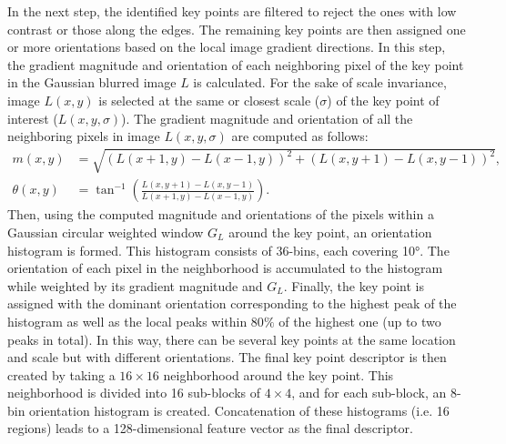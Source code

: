 \begin{description}
In the next step, the identified key points are filtered to reject the ones with low contrast or those along the edges.
The remaining key points are then assigned one or more orientations based on the local image gradient directions.
In this step, the gradient magnitude and orientation of each neighboring pixel of the key point in the Gaussian blurred image $L$ is calculated.
For the sake of scale invariance, image $L(x,y)$ is selected at the same or closest scale ($\sigma$) of the key point of interest ($L(x,y,\sigma)$).
The gradient magnitude and orientation of all the neighboring pixels in image $L(x,y,\sigma)$ are computed as follows: 
\begin{subequations}
\begin{align}
m(x,y) & = \sqrt{(L(x+1,y) - L(x-1,y))^{2}+(L(x,y+1)-L(x,y-1))^{2}},\\
\theta(x,y) & = \tan^{-1}\left(\frac{L(x,y+1) - L(x,y-1)}{L(x+1,y) - L(x-1,y)}\right).
\end{align}
\end{subequations}
Then, using the computed magnitude and orientations of the pixels within a Gaussian circular weighted window $G_{L}$ around the key point, an orientation histogram is formed.
This histogram consists of 36-bins, each covering \ang{10}.
The orientation of each pixel in the neighborhood is accumulated to the histogram while weighted by its gradient magnitude and $G_{L}$.
Finally, the key point is assigned with the dominant orientation corresponding to the highest peak of the histogram as well as the local peaks within 80$\%$ of the highest one (up to two peaks in total). 
In this way, there can be several key points at the same location and scale but with different orientations.
The final key point descriptor is then created by taking a $16\times16$ neighborhood around the key point.
This neighborhood is divided into 16 sub-blocks of $4\times4$, and for each sub-block, an 8-bin orientation histogram is created.
Concatenation of these histograms (i.e. 16 regions) leads to a 128-dimensional feature vector as the final descriptor. 

\end{description}
